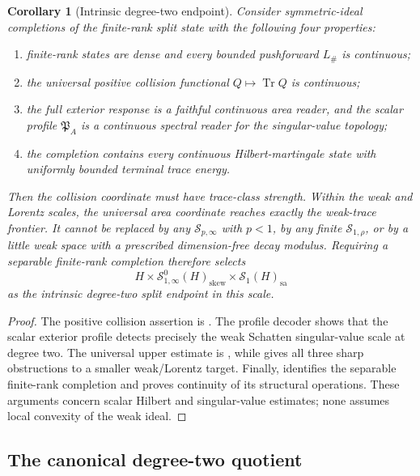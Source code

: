 \documentclass[10pt,reqno]{amsart}
\theoremstyle{plain}
\newtheorem{corollary}[theorem]{Corollary}
\theoremstyle{definition}
\theoremstyle{remark}
\begin{document}
\begin{corollary}[Intrinsic degree-two endpoint]
\label{cc:cor-intrinsic-degree-two-endpoint}
Consider symmetric-ideal completions of the finite-rank split state with
the following four properties:
\begin{enumerate}[label=\textup{(\roman*)},leftmargin=2.8em]
\item finite-rank states are dense and every bounded pushforward
      \(L_\#\) is continuous;
\item the universal positive collision functional
      \(Q\mapsto\operatorname{Tr}Q\) is continuous;
\item the full exterior response is a faithful continuous area reader,
      and the scalar profile \(\mathfrak P_A\) is a continuous spectral
      reader for the singular-value topology;
\item the completion contains every continuous Hilbert-martingale state
      with uniformly bounded terminal trace energy.
\end{enumerate}
Then the collision coordinate must have trace-class strength.  Within the
weak and Lorentz scales, the universal area coordinate reaches exactly
the weak-trace frontier.  It cannot be replaced by any
\(\mathcal S_{p,\infty}\) with \(p<1\), by any finite
\(\mathcal S_{1,\rho}\), or by a little weak space with a prescribed
dimension-free decay modulus.  Requiring a separable finite-rank
completion therefore selects
\[
 H\times\mathcal S^0_{1,\infty}(H)_{\mathrm{skew}}
   \times\mathcal S_1(H)_{\mathrm{sa}}
\]
as the intrinsic degree-two split endpoint in this scale.
\end{corollary}

\begin{proof}
The positive collision assertion is
.  The profile decoder
 shows that the scalar exterior
profile detects precisely the weak Schatten singular-value scale at
degree two.  The universal upper estimate is
, while
 gives all three sharp
obstructions to a smaller weak/Lorentz target.  Finally,
 identifies the separable
finite-rank completion and proves continuity of its structural
operations.  These arguments concern scalar Hilbert and singular-value
estimates; none assumes local convexity of the weak ideal.
\end{proof}

\subsection{The canonical degree-two quotient}
\label{cc:subsec-critical-causal-quotient}
\end{document}
